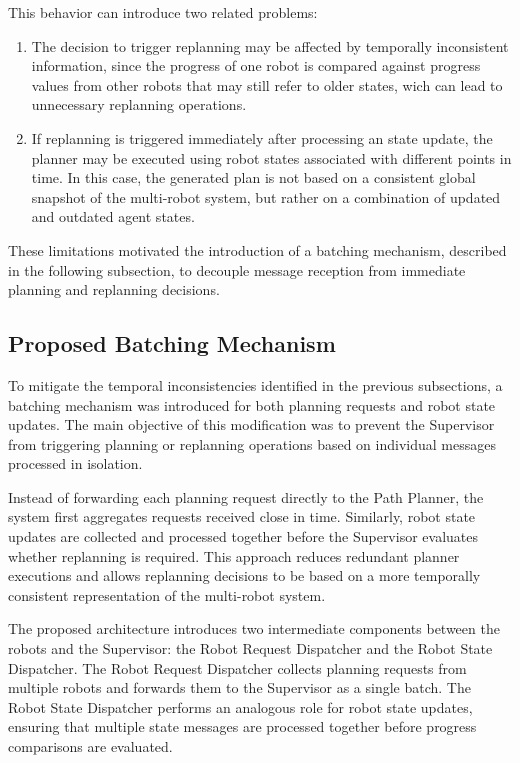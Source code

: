 This behavior can introduce two related problems:
\begin{enumerate}
    \item The decision to trigger replanning may be affected by temporally inconsistent information, since the progress of one robot is compared against progress values from other robots that may still refer to older states, wich can lead to unnecessary replanning operations.
    \item If replanning is triggered immediately after processing an state update, the planner may be executed using robot states associated with different points in time. In this case, the generated plan is not based on a consistent global snapshot of the multi-robot system, but rather on a combination of updated and outdated agent states.
\end{enumerate}

These limitations motivated the introduction of a batching mechanism, described in the following subsection, to decouple message reception from immediate planning and replanning decisions.

\subsection{Proposed Batching Mechanism}
\label{subsec:batching_mechanism}
\hspace{\parindent}
To mitigate the temporal inconsistencies identified in the previous subsections, a batching mechanism was introduced for both planning requests and robot state updates. The main objective of this modification was to prevent the Supervisor from triggering planning or replanning operations based on individual messages processed in isolation.

Instead of forwarding each planning request directly to the Path Planner, the system first aggregates requests received close in time. Similarly, robot state updates are collected and processed together before the Supervisor evaluates whether replanning is required. This approach reduces redundant planner executions and allows replanning decisions to be based on a more temporally consistent representation of the multi-robot system.

The proposed architecture introduces two intermediate components between the robots and the Supervisor: the Robot Request Dispatcher and the Robot State Dispatcher. The Robot Request Dispatcher collects planning requests from multiple robots and forwards them to the Supervisor as a single batch. The Robot State Dispatcher performs an analogous role for robot state updates, ensuring that multiple state messages are processed together before progress comparisons are evaluated.

